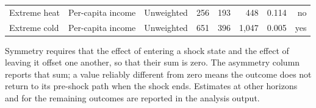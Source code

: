 \begin{table}[htbp]
\begin{tabularx}{\textwidth}{>{\raggedright\arraybackslash}p{2.4cm} >{\raggedright\arraybackslash}X >{\raggedright\arraybackslash}p{2.1cm} r r r r r}
Extreme heat & Per-capita income & Unweighted & 256 & 193 & 448 & 0.114 & no \\
Extreme cold & Per-capita income & Unweighted & 651 & 396 & 1,047 & 0.005 & yes \\
\bottomrule
\end{tabularx}
\begin{minipage}{\textwidth}\vspace{0.5em}\footnotesize
Symmetry requires that the effect of entering a shock state and the effect of leaving it offset one another, so that their sum is zero. The asymmetry column reports that sum; a value reliably different from zero means the outcome does not return to its pre-shock path when the shock ends. Estimates at other horizons and for the remaining outcomes are reported in the analysis output.
\end{minipage}
\end{table}

